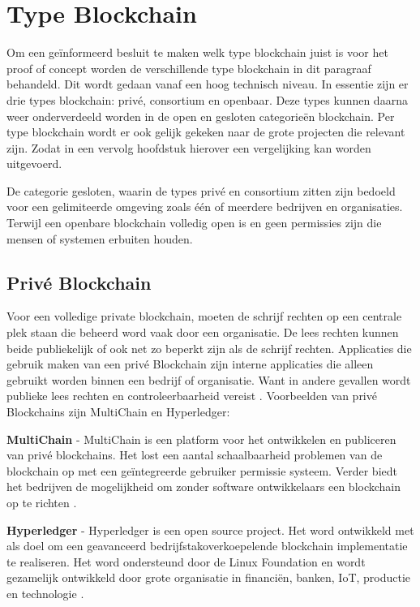\section{Type Blockchain}
Om een geïnformeerd besluit te maken welk type blockchain juist is voor het proof of concept worden de verschillende type blockchain in dit paragraaf behandeld. Dit wordt gedaan vanaf een hoog technisch niveau. In essentie zijn er drie types blockchain: privé, consortium en openbaar. Deze types kunnen daarna weer onderverdeeld worden in de open en gesloten categorieën blockchain. Per type blockchain wordt er ook gelijk gekeken naar de grote projecten die relevant zijn. Zodat in een vervolg hoofdstuk hierover een vergelijking kan worden uitgevoerd.\par

De categorie gesloten, waarin de types privé en consortium zitten zijn bedoeld voor een gelimiteerde omgeving zoals één of meerdere bedrijven en organisaties. Terwijl een openbare blockchain volledig open is en geen permissies zijn die mensen of systemen erbuiten houden.

\subsection{Privé Blockchain}
Voor een volledige private blockchain, moeten de schrijf rechten op een centrale plek staan die beheerd word vaak door een organisatie. De lees rechten kunnen beide publiekelijk of ook net zo beperkt zijn als de schrijf rechten. Applicaties die gebruik maken van een privé Blockchain zijn interne applicaties die alleen gebruikt worden binnen een bedrijf of organisatie. Want in andere gevallen wordt publieke lees rechten en controleerbaarheid vereist \cite{privateBlockChains}. Voorbeelden van privé Blockchains zijn MultiChain en Hyperledger:

\textbf{MultiChain} - MultiChain is een platform voor het ontwikkelen en publiceren van privé blockchains. Het lost een aantal schaalbaarheid problemen \cite{oreillyScalability} van de blockchain op met een geïntegreerde gebruiker permissie systeem. Verder biedt het bedrijven de mogelijkheid om zonder software ontwikkelaars een blockchain op te richten \cite{mutlichain}.

\textbf{Hyperledger} - Hyperledger is een open source project. Het word ontwikkeld met als doel om een geavanceerd bedrijfstakoverkoepelende blockchain implementatie te realiseren. Het word ondersteund door de Linux Foundation \cite{linuxFoundation} en wordt gezamelijk ontwikkeld door grote organisatie in financiën, banken, IoT, productie en technologie \cite{hyperledger}. 

